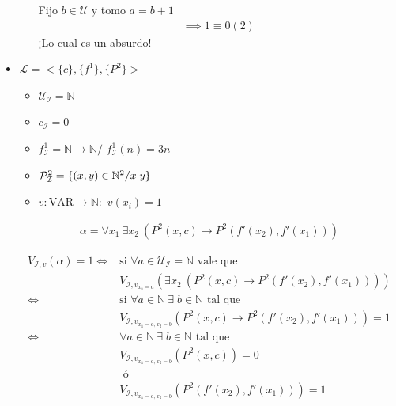 \begin{itemize}
\begin{enumerate}
            Fijo $b \in \mathcal{U}$ y tomo $a = b+1$
            \begin{gather*}
                \implies 1 \equiv 0 (2)
            \end{gather*}
            ¡Lo cual es un absurdo!
    \end{enumerate}

    \item $\mathcal{L} = <\{ c \}, \{ f^1 \}, \{ P^2 \}>$

        \begin{itemize}
            \item $\mathcal{U}_{\mathcal{I}} = \mathbb{N}$
            \item $c_{\mathcal{I}} = 0$
            \item $f_{\mathcal{I}}^{1} = \mathbb{N} \to \mathbb{N}/$
            $f_{\mathcal{I}}^{1} (n) = 3n$
            \item $\mathcal{P}_{\mathcal{I}}^{2} = 
                \{ (x,y) \in \mathbb{N}^2 / \divides{x}{y} \}$
            \item $v: \mathrm{VAR} \to \mathbb{N}:$
                $v(x_i) = 1$ 
        \end{itemize}

        \begin{gather*}
            \alpha = \forall x_1 ~ \exists x_2 ~ 
            \left( P^2(x,c) \to P^2(f'(x_2),f'(x_1))\right)
        \end{gather*}

        \begin{align*}
            V_{\mathcal{I}, v}(\alpha) = 1 \iff& 
            \text{si } \forall a \in \mathcal{U}_{\mathcal{I}} = \mathbb{N}
            \text{ vale que} \\
            & V_{\mathcal{I}, v_{x_1 = a}} \left(\exists x_2 ~ 
            \left( P^2(x,c) \to P^2(f'(x_2),f'(x_1))\right)\right) \\
            \iff& \text{si } \forall a \in \mathbb{N} ~ 
            \exists \; b \in \mathbb{N} \text{ tal que}\\
            &V_{\mathcal{I}, v_{x_1 = a, x_2 = b}}
            \left(P^2(x,c)\to P^2(f'(x_2), f'(x_1))\right) = 1 \\
            \iff& \forall a \in \mathbb{N} ~ 
            \exists \; b \in \mathbb{N} \text{ tal que}\\
            &V_{\mathcal{I}, v_{x_1 = a, x_2 = b}} \left(P^2(x,c)\right) = 0
            \\ & \text{ ó }\\
            &V_{\mathcal{I}, v_{x_1 = a, x_2 = b}} 
            \left(P^2(f'(x_2), f'(x_1))\right) = 1
        \end{align*}


\end{itemize}
